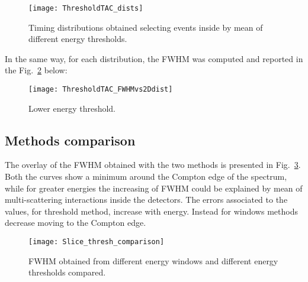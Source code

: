 \begin{figure}[H]
	\centering
	\texttt{[image: ThresholdTAC\_dists]}
	\caption{Timing distributions obtained selecting events inside by mean of different energy thresholds.}
	\label{Fig: lower energy thr}
\end{figure}
\newpage
In the same way, for each distribution, the FWHM was computed and reported in the Fig.~\ref{Fig:2Dplot_th} below:

\begin{figure}[H]
	\centering
	\texttt{[image: ThresholdTAC\_FWHMvs2Ddist]}
	\caption{Lower energy threshold.}
	\label{Fig:2Dplot_th}
\end{figure}

\subsection*{Methods  comparison}

The overlay of the FWHM obtained with the two methods is presented in Fig.~\ref{Fig:Slice_th_comp}. Both the curves show a minimum around the Compton edge of the spectrum, while for greater energies the increasing of FWHM could be explained by mean of multi-scattering interactions inside the detectors. The errors associated to the values, for threshold method, increase with energy. Instead for windows methods decrease moving to the Compton edge. %


\begin{figure}[H]
	\centering
	\texttt{[image: Slice\_thresh\_comparison]}
	\caption{FWHM obtained from different energy windows and different energy thresholds compared.}
	\label{Fig:Slice_th_comp}
\end{figure}










